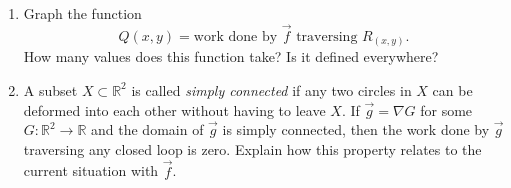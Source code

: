 \documentclass[letter]{article}
\newcommand{\R}{\mathbb{R}}
\begin{document}
\begin{enumerate}
\begin{enumerate}
				\item Graph the function \[
						Q(x,y) = \text{work done by $\vec f$ traversing }R_{(x,y)}.
					\]
					How many values does this function take?  Is it defined everywhere?
				\item A subset $X\subset \R^2$ is called \emph{simply connected} if any two circles
					in $X$
					can be deformed into each other without having to leave $X$.  If
					$\vec g= \nabla G$ for some $G:\R^2\to\R$ and the domain of $\vec g$ is
					simply connected, then the work done by $\vec g$ traversing
					any closed loop is zero.  Explain how this property relates 
					to the current situation with $\vec f$.
			\end{enumerate}

	\end{enumerate}
\end{document}
